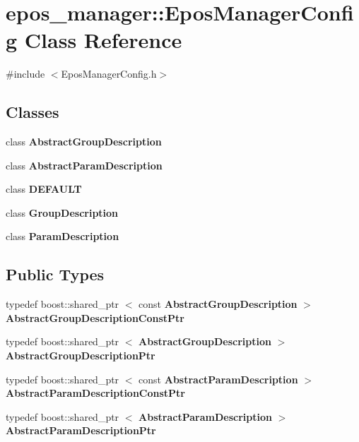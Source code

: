 \section{epos\-\_\-manager\-:\-:\-Epos\-Manager\-Config \-Class \-Reference}
\label{classepos__manager_1_1EposManagerConfig}


{\ttfamily \#include $<$\-Epos\-Manager\-Config.\-h$>$}

\subsection*{\-Classes}
\begin{DoxyCompactItemize}
\item 
class {\bf \-Abstract\-Group\-Description}
\item 
class {\bf \-Abstract\-Param\-Description}
\item 
class {\bf \-D\-E\-F\-A\-U\-L\-T}
\item 
class {\bf \-Group\-Description}
\item 
class {\bf \-Param\-Description}
\end{DoxyCompactItemize}
\subsection*{\-Public \-Types}
\begin{DoxyCompactItemize}
\item 
typedef boost\-::shared\-\_\-ptr\*
$<$ const \*
{\bf \-Abstract\-Group\-Description} $>$ {\bf \-Abstract\-Group\-Description\-Const\-Ptr}
\item 
typedef boost\-::shared\-\_\-ptr\*
$<$ {\bf \-Abstract\-Group\-Description} $>$ {\bf \-Abstract\-Group\-Description\-Ptr}
\item 
typedef boost\-::shared\-\_\-ptr\*
$<$ const \*
{\bf \-Abstract\-Param\-Description} $>$ {\bf \-Abstract\-Param\-Description\-Const\-Ptr}
\item 
typedef boost\-::shared\-\_\-ptr\*
$<$ {\bf \-Abstract\-Param\-Description} $>$ {\bf \-Abstract\-Param\-Description\-Ptr}
\end{DoxyCompactItemize}
